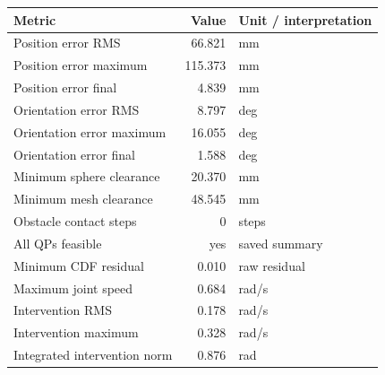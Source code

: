 \begin{tabular}{lrl}
\toprule
Metric & Value & Unit / interpretation \\
\midrule
Position error RMS & 66.821 & mm \\
Position error maximum & 115.373 & mm \\
Position error final & 4.839 & mm \\
Orientation error RMS & 8.797 & deg \\
Orientation error maximum & 16.055 & deg \\
Orientation error final & 1.588 & deg \\
Minimum sphere clearance & 20.370 & mm \\
Minimum mesh clearance & 48.545 & mm \\
Obstacle contact steps & 0 & steps \\
All QPs feasible & yes & saved summary \\
Minimum CDF residual & 0.010 & raw residual \\
Maximum joint speed & 0.684 & rad/s \\
Intervention RMS & 0.178 & rad/s \\
Intervention maximum & 0.328 & rad/s \\
Integrated intervention norm & 0.876 & rad \\
\bottomrule
\end{tabular}
